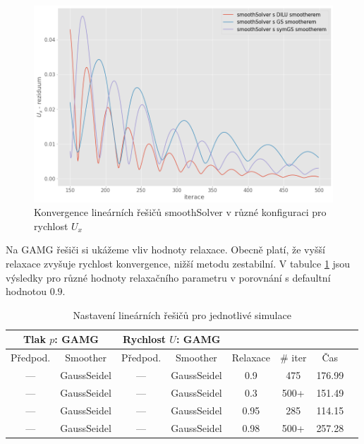 \documentclass[a4paper,12pt]{report}
\theoremstyle{remark}
\begin{document}
\begin{figure}[H]
	\centering
	\includegraphics[width=1\linewidth]{ux-residuum-smooth.png}
	\caption{Konvergence lineárních řešičů smoothSolver v různé konfiguraci pro rychlost $U_x$}
	\label{fig:ux-residuum-smooth}
\end{figure}
	


Na GAMG řešiči si ukážeme vliv hodnoty relaxace. Obecně platí, že vyšší relaxace zvyšuje rychlost konvergence, nižší metodu zestabilní. V tabulce \ref{table:solvers_gamg_relax} jsou výsledky pro různé hodnoty relaxačního parametru v porovnání s defaultní hodnotou $0.9$. 

 \begin{table}[H]
	\centering
	\caption{Nastavení lineárních řešičů pro jednotlivé simulace}
	\renewcommand{\arraystretch}{1.9}
	\begin{tabular}{*8c}
		\toprule
		\multicolumn{2}{c}{Tlak $p$: \textbf{GAMG}} & \multicolumn{2}{c}{Rychlost $U$: \textbf{GAMG}}\\		
		\midrule
		Předpod.&Smoother&Předpod.&Smoother&Relaxace& \# iter&Čas\\
		
		\midrule
		
		--- & GaussSeidel &  --- & GaussSeidel & 0.9&475&176.99\\
		--- & GaussSeidel &  --- & GaussSeidel & 0.3&500+&151.49\\
		--- & GaussSeidel &  --- & GaussSeidel & 0.95&285&114.15\\
		--- & GaussSeidel &  --- & GaussSeidel & 0.98&500+&257.28\\		
		\bottomrule
	\end{tabular}
	
	\label{table:solvers_gamg_relax}
	
\end{table}
\end{document}
